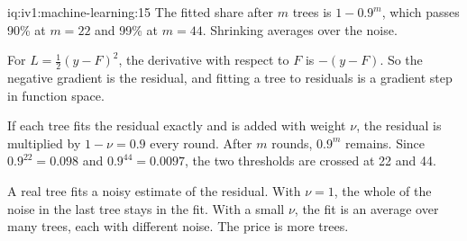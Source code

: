 \begin{solution}{iq:iv1:machine-learning:15}
The fitted share after $m$ trees is $1 - 0.9^m$, which passes 90\% at $m = 22$ and 99\% at $m = 44$. Shrinking averages over the noise.

For $L = \frac12(y - F)^2$, the derivative with respect to $F$ is $-(y - F)$. So the negative gradient is the residual, and fitting a tree to residuals is a gradient step in function space.

If each tree fits the residual exactly and is added with weight $\nu$, the residual is multiplied by $1 - \nu = 0.9$ every round. After $m$ rounds, $0.9^m$ remains. Since $0.9^{22} = 0.098$ and $0.9^{44} = 0.0097$, the two thresholds are crossed at 22 and 44.

A real tree fits a noisy estimate of the residual. With $\nu = 1$, the whole of the noise in the last tree stays in the fit. With a small $\nu$, the fit is an average over many trees, each with different noise. The price is more trees.



\end{solution}

